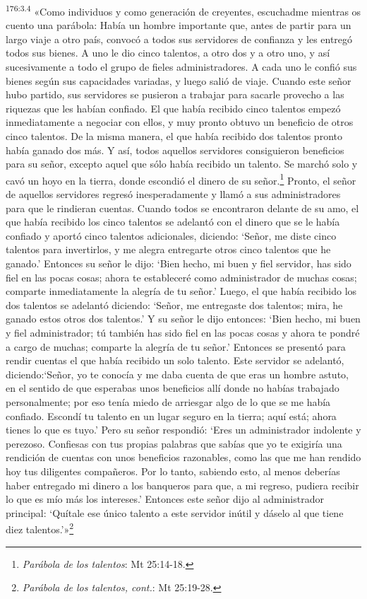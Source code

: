 \par 
\textsuperscript{176:3.4} «Como individuos y como generación de creyentes, escuchadme mientras os cuento una parábola: Había un hombre importante que, antes de partir para un largo viaje a otro país, convocó a todos sus servidores de confianza y les entregó todos sus bienes. A uno le dio cinco talentos, a otro dos y a otro uno, y así sucesivamente a todo el grupo de fieles administradores. A cada uno le confió sus bienes según sus capacidades variadas, y luego salió de viaje. Cuando este señor hubo partido, sus servidores se pusieron a trabajar para sacarle provecho a las riquezas que les habían confiado. El que había recibido cinco talentos empezó inmediatamente a negociar con ellos, y muy pronto obtuvo un beneficio de otros cinco talentos. De la misma manera, el que había recibido dos talentos pronto había ganado dos más. Y así, todos aquellos servidores consiguieron beneficios para su señor, excepto aquel que sólo había recibido un talento. Se marchó solo y cavó un hoyo en la tierra, donde escondió el dinero de su señor.\footnote{\textit{Parábola de los talentos}: Mt 25:14-18.} Pronto, el señor de aquellos servidores regresó inesperadamente y llamó a sus administradores para que le rindieran cuentas. Cuando todos se encontraron delante de su amo, el que había recibido los cinco talentos se adelantó con el dinero que se le había confiado y aportó cinco talentos adicionales, diciendo: `Señor, me diste cinco talentos para invertirlos, y me alegra entregarte otros cinco talentos que he ganado.' Entonces su señor le dijo: `Bien hecho, mi buen y fiel servidor, has sido fiel en las pocas cosas; ahora te estableceré como administrador de muchas cosas; comparte inmediatamente la alegría de tu señor.' Luego, el que había recibido los dos talentos se adelantó diciendo: `Señor, me entregaste dos talentos; mira, he ganado estos otros dos talentos.' Y su señor le dijo entonces: `Bien hecho, mi buen y fiel administrador; tú también has sido fiel en las pocas cosas y ahora te pondré a cargo de muchas; comparte la alegría de tu señor.' Entonces se presentó para rendir cuentas el que había recibido un solo talento. Este servidor se adelantó, diciendo:`Señor, yo te conocía y me daba cuenta de que eras un hombre astuto, en el sentido de que esperabas unos beneficios allí donde no habías trabajado personalmente; por eso tenía miedo de arriesgar algo de lo que se me había confiado. Escondí tu talento en un lugar seguro en la tierra; aquí está; ahora tienes lo que es tuyo.' Pero su señor respondió: `Eres un administrador indolente y perezoso. Confiesas con tus propias palabras que sabías que yo te exigiría una rendición de cuentas con unos beneficios razonables, como las que me han rendido hoy tus diligentes compañeros. Por lo tanto, sabiendo esto, al menos deberías haber entregado mi dinero a los banqueros para que, a mi regreso, pudiera recibir lo que es mío más los intereses.' Entonces este señor dijo al administrador principal: `Quítale ese único talento a este servidor inútil y dáselo al que tiene diez talentos.'»\footnote{\textit{Parábola de los talentos, cont.}: Mt 25:19-28.}

